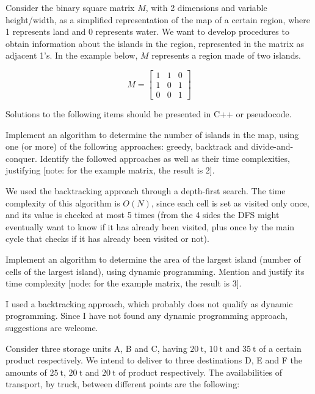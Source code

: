 {

Consider the binary square matrix $M$, with 2 dimensions and variable height/width, as a simplified representation of the map of a certain region, where 1 represents land and 0 represents water. We want to develop procedures to obtain information about the islands in the region, represented in the matrix as adjacent 1's. In the example below, $M$ represents a region made of two islands.

\begin{equation*}
    M = \begin{bmatrix}
        1 & 1 & 0 \\
        1 & 0 & 1 \\
        0 & 0 & 1
    \end{bmatrix}
\end{equation*}

Solutions to the following items should be presented in C++ or pseudocode.

Implement an algorithm to determine the number of islands in the map, using one (or more) of the following approaches: greedy, backtrack and divide-and-conquer. Identify the followed approaches as well as their time complexities, justifying [note: for the example matrix, the result is 2].

\ansseparator



We used the backtracking approach through a depth-first search. The time complexity of this algorithm is $O(N)$, since each cell is set as visited only once, and its value is checked at most 5 times (from the 4 sides the DFS might eventually want to know if it has already been visited, plus once by the main cycle that checks if it has already been visited or not).

Implement an algorithm to determine the area of the largest island (number of cells of the largest island), using dynamic programming. Mention and justify its time complexity [node: for the example matrix, the result is 3].

\ansseparator



I used a backtracking approach, which probably does not qualify as dynamic programming. Since I have not found any dynamic programming approach, suggestions are welcome.

\newpage
{}
Consider three storage units A, B and C, having $\SI{20}{\tonne}$, $\SI{10}{\tonne}$ and $\SI{35}{\tonne}$ of a certain product respectively. We intend to deliver to three destinations D, E and F the amounts of $\SI{25}{\tonne}$, $\SI{20}{\tonne}$ and $\SI{20}{\tonne}$ of product respectively. The availabilities of transport, by truck, between different points are the following:

}
